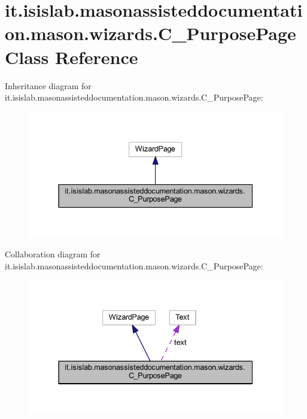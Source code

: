 \hypertarget{classit_1_1isislab_1_1masonassisteddocumentation_1_1mason_1_1wizards_1_1_c___purpose_page}{\section{it.\-isislab.\-masonassisteddocumentation.\-mason.\-wizards.\-C\-\_\-\-Purpose\-Page Class Reference}
\label{classit_1_1isislab_1_1masonassisteddocumentation_1_1mason_1_1wizards_1_1_c___purpose_page}
}


Inheritance diagram for it.\-isislab.\-masonassisteddocumentation.\-mason.\-wizards.\-C\-\_\-\-Purpose\-Page\-:\nopagebreak
\begin{figure}[H]
\begin{center}
\leavevmode
\includegraphics[width=337pt]{classit_1_1isislab_1_1masonassisteddocumentation_1_1mason_1_1wizards_1_1_c___purpose_page__inherit__graph}
\end{center}
\end{figure}


Collaboration diagram for it.\-isislab.\-masonassisteddocumentation.\-mason.\-wizards.\-C\-\_\-\-Purpose\-Page\-:\nopagebreak
\begin{figure}[H]
\begin{center}
\leavevmode
\includegraphics[width=337pt]{classit_1_1isislab_1_1masonassisteddocumentation_1_1mason_1_1wizards_1_1_c___purpose_page__coll__graph}
\end{center}
\end{figure}
